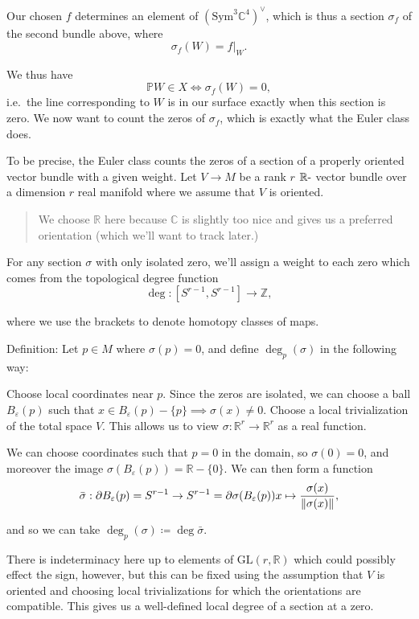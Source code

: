 \documentclass[11pt]{scrreprt}
\theoremstyle{definition}
\newcommand{\RR}[0]{{\mathbb{R}}}
\newcommand{\ZZ}[0]{{\mathbb{Z}}}
\newcommand{\CC}[0]{{\mathbb{C}}}
\newcommand{\PP}[0]{{\mathbb{P}}}
\newcommand{\GL}[0]{{\text{GL}}}
\newcommand{\dual}[0]{\vee}
\newcommand{\sym}[0]{\mathrm{Sym}}
\newcommand{\theset}[1]{\{{#1}\}}
\newcommand{\norm}[1]{{{\lVert}{#1}{\rVert}}}
\newcommand{\restrictionof}[2]{{\left.{#1}\right|_{#2}}}
\newcommand{\dash}[0]{{\hbox{-}}}
\newcommand{\del}[0]{{\partial}}
\newcommand{\definedas}[0]{\coloneqq}
\begin{document}
Our chosen \(f\) determines an element of \((\sym^3 \CC^4)^\dual\),
which is thus a section \(\sigma_f\) of the second bundle above, where
\[
\sigma_f(W) = \restrictionof{f}{W}.
\]

We thus have \[
\PP W \in X \iff \sigma_f(W) = 0,
\] i.e.~the line corresponding to \(W\) is in our surface exactly when
this section is zero. We now want to count the zeros of \(\sigma_f\),
which is exactly what the Euler class does.

To be precise, the Euler class counts the zeros of a section of a
properly oriented vector bundle with a given weight. Let \(V\to M\) be a
rank \(r\) \(\RR\dash\) vector bundle over a dimension \(r\) real
manifold where we assume that \(V\) is oriented.

\begin{quote}
We choose \(\RR\) here because \(\CC\) is slightly too nice and gives us
a preferred orientation (which we'll want to track later.)
\end{quote}

For any section \(\sigma\) with only isolated zero, we'll assign a
weight to each zero which comes from the topological degree function \[
\deg: [S^{r-1}, S^{r-1}] \to \ZZ,
\]

where we use the brackets to denote homotopy classes of maps.

Definition: Let \(p\in M\) where \(\sigma(p) = 0\), and define
\(\deg_p(\sigma)\) in the following way:

Choose local coordinates near \(p\). Since the zeros are isolated, we
can choose a ball \(B_\varepsilon(p)\) such that
\(x\in B_\varepsilon(p) - \theset{p} \implies \sigma(x) \neq 0\). Choose
a local trivialization of the total space \(V\). This allows us to view
\(\sigma: \RR^r \to \RR^r\) as a real function.

We can choose coordinates such that \(p = 0\) in the domain, so
\(\sigma(0) = 0\), and moreover the image
\(\sigma(B_\varepsilon(p)) = \RR - \theset{0}\). We can then form a
function \[
\bar\sigma: \del B_\varepsilon(p) = S^{r-1} \to S^{r-1} = \del \sigma(B_\varepsilon(p)) \\
x \mapsto \frac{\sigma(x)} {\norm{\sigma(x)}},
\]

and so we can take \(\deg_p(\sigma) \definedas \deg \bar \sigma\).

There is indeterminacy here up to elements of \(\GL(r, \RR)\) which
could possibly effect the sign, however, but this can be fixed using the
assumption that \(V\) is oriented and choosing local trivializations for
which the orientations are compatible. This gives us a well-defined
local degree of a section at a zero.
\end{document}
